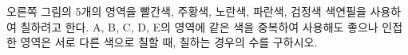 \noindent\begin{minipage}[t]{0.58\linewidth}\vspace{0pt}\raggedright 오른쪽 그림의 5개의 영역을 빨간색, 주황색, 노란색, 파란색, 검정색 색연필을 사용하여 칠하려고 한다. A, B, C, D, E의 영역에 같은 색을 중복하여 사용해도 좋으나 인접한 영역은 서로 다른 색으로 칠할 때, 칠하는 경우의 수를 구하시오. \end{minipage}\hfill\begin{minipage}[t]{0.4\linewidth}\vspace{0pt}\centering \resizebox{\ifdim\width>\linewidth\linewidth\else\width\fi}{!}{}\end{minipage}\par
